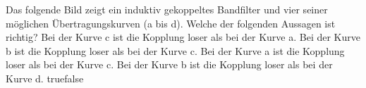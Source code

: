     {Das folgende Bild zeigt ein induktiv gekoppeltes Bandfilter und vier seiner möglichen Übertragungskurven (a bis d). Welche der folgenden Aussagen ist richtig?}
    {Bei der Kurve c ist die Kopplung loser als bei der Kurve a.}
    {Bei der Kurve b ist die Kopplung loser als bei der Kurve c.}
    {Bei der Kurve a ist die Kopplung loser als bei der Kurve c.}
    {Bei der Kurve b ist die Kopplung loser als bei der Kurve d.}
    {true}{false}